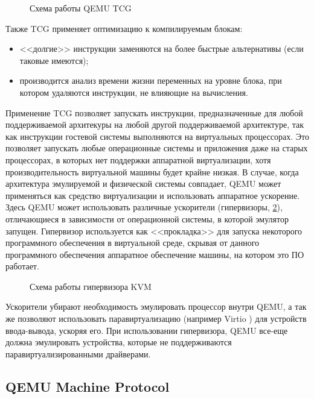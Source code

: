 \begin{figure}[!htbp]
    \centering
    
    \caption{Схема работы QEMU TCG}\label{fig:qemu-tcg}
\end{figure}

Также TCG применяет оптимизацию к компилируемым блокам:
\begin{itemize}
    \item <<долгие>> инструкции заменяются на более быстрые альтернативы (если таковые имеются);
    \item производится анализ времени жизни переменных на уровне блока, при котором
        удаляются инструкции, не влияющие на вычисления.
\end{itemize}

Применение TCG позволяет запускать инструкции, предназначенные для любой поддерживаемой архитекуры
на любой другой поддерживаемой архитектуре, так как инструкции гостевой системы выполняются на виртуальных процессорах.
Это позволяет запускать любые операционные системы и приложения даже на старых процессорах, в которых нет поддержки
аппаратной виртуализации, хотя производительность виртуальной машины будет крайне низкая.
В случае, когда архитектура эмулируемой и физической системы совпадает, QEMU может применяться как средство виртуализации
и использовать аппаратное ускорение.
Здесь QEMU может использовать различные ускорители (гипервизоры, \cref{fig:kvm}),
отличающиеся в зависимости от операционной системы, в которой эмулятор запущен.
Гипервизор используется как <<прокладка>> для запуска некоторого программного обеспечения в виртуальной среде,
скрывая от данного программного обеспечения аппаратное обеспечение машины, на котором это ПО работает.

\begin{figure}[!htbp]
    \centering
    
    \caption{Схема работы гипервизора KVM \cite{kvm}}\label{fig:kvm}
\end{figure}

Ускорители убирают необходимость эмулировать процессор внутри QEMU, а так же позволяют использовать
паравиртуализацию (например Virtio \cite{virtio}) для устройств ввода-вывода, ускоряя его.
При использовании гипервизора, QEMU все-еще должна эмулировать устройства, которые не поддерживаются
паравиртуализированными драйверами.


\subsection{QEMU Machine Protocol}\label{sec:ch1/sec4/sub2/sub2}

